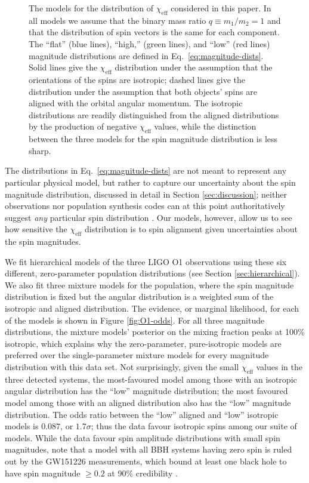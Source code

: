 \documentclass[modern,linenumbers]{aastex61}
\newcommand{\chieff}{\chi_\mathrm{eff}}
\newcommand{\OOneSigmaIsoAligned}{1.7}
\newcommand{\OOneOddsIsoAligned}{0.087}
\begin{document}
\begin{figure}
  \caption{\label{fig:chieff-distribution-models} The models for the
    distribution of $\chieff$ considered in this paper.  In all models
    we assume that the binary mass ratio $q \equiv m_1/m_2 = 1$ and
    that the distribution of spin vectors is the same for each
    component.  The ``flat'' (blue lines), ``high,'' (green lines),
    and ``low'' (red lines) magnitude distributions are defined in
    Eq.\ \eqref{eq:magnitude-dists}.  Solid lines give the $\chieff$
    distribution under the assumption that the orientations of the
    spins are isotropic; dashed lines give the distribution under the
    assumption that both objects' spins are aligned with the orbital
    angular momentum.  The isotropic distributions are readily
    distinguished from the aligned distributions by the production of negative
    $\chieff$ values, while the distinction between the three models
    for the spin magnitude distribution is less sharp.}
\end{figure}

The distributions in Eq.\ \eqref{eq:magnitude-dists} are not meant to
represent any particular physical model, but rather to capture our
uncertainty about the spin magnitude distribution, discussed in detail
in Section \ref{sec:discussion}; neither observations nor population
synthesis codes can at this point authoritatively suggest \emph{any}
particular spin distribution \citep{2015PhR...548....1M}.  Our models,
however, allow us to see how sensitive the $\chieff$ distribution is
to spin alignment given uncertainties about the spin magnitudes.

We fit hierarchical models of the three LIGO O1 observations using
these six different, zero-parameter population distributions (see
Section \ref{sec:hierarchical}).  We also fit three mixture models for
the population, where the spin magnitude distribution is fixed but the
angular distribution is a weighted sum of the isotropic and aligned
distribution.  The evidence, or marginal likelihood, for each of the
models is shown in Figure \ref{fig:O1-odds}.  For all three magnitude
distributions, the mixture models' posterior on the mixing fraction
peaks at 100\% isotropic, which explains why the zero-parameter,
pure-isotropic models are preferred over the single-parameter mixture
models for every magnitude distribution with this data set.  Not
surprisingly, given the small $\chieff$ values in the three detected
systems, the most-favoured model among those with an isotropic angular
distribution has the ``low'' magnitude distribution; the most favoured
model among those with an aligned distribution also has the ``low''
magnitude distribution.  The odds ratio between the ``low'' aligned
and ``low'' isotropic models is $\OOneOddsIsoAligned$, or
$\OOneSigmaIsoAligned\sigma$; thus the data favour isotropic spins
among our suite of models.  While the data favour spin amplitude
distributions with small spin magnitudes, note that a model with all
\ac{BBH} systems having zero spin is ruled out by the GW151226
measurements, which bound at least one black hole to have spin
magnitude $\geq 0.2$ at 90\% credibility \citep{2016PhRvL.116x1103A}.
\end{document}
